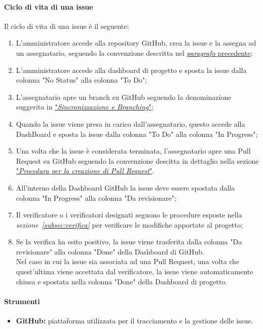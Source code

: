 \paragraph*{Ciclo di vita di una issue}
Il ciclo di vita di una issue è il seguente:
\begin{enumerate}
    \item L'amministratore accede alla repository GitHub, crea la issue e la assegna ad un assegnatario, seguendo la convenzione descritta nel \hyperlink{par:proceduraCreazioneIssue}{\textit{paragrafo} precedente};
    \item L'amministratore accede alla dashboard di progetto e sposta la issue dalla colonna "No Status" alla colonna "To Do";
    \item L'assegnatario apre un branch su GitHub seguendo la denominazione suggerita in \hyperlink{subsubsec:sincronizzazione&branching}{"\textit{Sincronizzazione e Branching}"};
    \item Quando la issue viene presa in carico dall'assegnatario, questo accede alla DashBoard e sposta la issue dalla colonna "To Do" alla colonna "In Progress";
    \item Una volta che la issue è considerata terminata, l'assegnatario apre una Pull Request su GitHub seguendo la convenzione descitta in dettaglio nella sezione \hyperlink{par:creazionePR}{"\textit{Procedura per la creazione di Pull Request}"}.
    \item All'interno della Dashboard GitHub la issue deve essere spostata dalla colonna "In Progress" alla colonna "Da revisionare";
    \item Il verificatore o i verificatori designati seguono le procedure esposte nella \textit{sezione~\ref{subsec:verifica}} per verificare le modifiche apportate al progetto;
    \item Se la verifica ha esito positivo, la issue viene trasferita dalla colonna "Da revisionare" alla colonna "Done" della Dashboard di GitHub. \\
    Nel caso in cui la issue sia associata ad una Pull Request, una volta che quest'ultima viene accettata dal verificatore, la issue viene automaticamente chiusa e spostata nella colonna "Done" della Dashboard di progetto. 
\end{enumerate}

\paragraph{Strumenti}
\begin{itemize}
  \item \textbf{GitHub:} piattaforma utilizzata per il tracciamento e la gestione delle issue.
\end{itemize}

